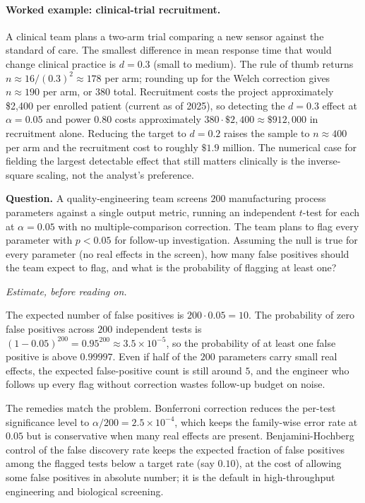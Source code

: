 \paragraph{Worked example: clinical-trial recruitment.} A clinical
team plans a two-arm trial comparing a new sensor against the
standard of care. The smallest difference in mean response time
that would change clinical practice is $d = 0.3$ (small to medium).
The rule of thumb returns $n \approx 16/(0.3)^{2} \approx 178$ per
arm; rounding up for the Welch correction gives $n \approx 190$ per
arm, or $380$ total. Recruitment costs the project approximately
\$2{,}400 per enrolled patient (current as of 2025), so detecting
the $d = 0.3$ effect at $\alpha = 0.05$ and power $0.80$ costs
approximately $380 \cdot \$2{,}400 \approx \$912{,}000$ in
recruitment alone. Reducing the target to $d = 0.2$ raises the
sample to $n \approx 400$ per arm and the recruitment cost to
roughly $\$1.9$ million. The numerical case for fielding the largest
detectable effect that still matters clinically is the
inverse-square scaling, not the analyst's preference.

\begin{estimation}
\textbf{Question.} A quality-engineering team screens $200$
manufacturing process parameters against a single output metric,
running an independent $t$-test for each at $\alpha = 0.05$ with no
multiple-comparison correction. The team plans to flag every
parameter with $p < 0.05$ for follow-up investigation. Assuming the
null is true for every parameter (no real effects in the screen),
how many false positives should the team expect to flag, and what is
the probability of flagging at least one?

\smallskip
\textit{Estimate, before reading on.}

\smallskip
The expected number of false positives is $200 \cdot 0.05 = 10$.
The probability of zero false positives across $200$ independent
tests is $(1 - 0.05)^{200} = 0.95^{200} \approx 3.5 \times
10^{-5}$, so the probability of at least one false positive is
above $0.99997$.
Even if half of the $200$ parameters carry small real effects, the
expected false-positive count is still around $5$, and the engineer
who follows up every flag without correction wastes follow-up
budget on noise.

The remedies match the problem. Bonferroni correction reduces the
per-test significance level to $\alpha/200 = 2.5 \times 10^{-4}$,
which keeps the family-wise error rate at $0.05$ but is
conservative when many real effects are present. Benjamini-Hochberg
control of the false discovery rate
\cite{method:ch08-benjamini-hochberg-1995} keeps the expected
fraction of false positives among the flagged tests below a target
rate (say $0.10$), at the cost of allowing some false positives in
absolute number; it is the default in high-throughput engineering
and biological screening.
\end{estimation}

